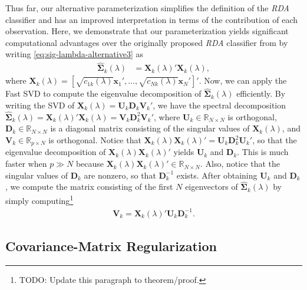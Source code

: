\documentclass[11pt]{article}
\begin{document}
Thus far, our alternative parameterization simplifies the definition of the \emph{RDA} classifier and has an improved interpretation in terms of the contribution of each observation. Here, we demonstrate that our parameterization yields significant computational advantages over the originally proposed \emph{RDA} classifier from \cite{Friedman:1989tm} by writing \eqref{eq:sig-lambda-alternative3} as
\begin{align*}
	\widehat{\bm\Sigma}_k(\lambda) &= \bm X_k(\lambda)' \bm X_k(\lambda),
\end{align*}
where $\bm X_k(\lambda) = [\sqrt{c_{1k}(\lambda)} \bm x_1', \ldots,  \sqrt{c_{Nk}(\lambda)} \bm x_N']'$. Now, we can apply the Fast SVD to compute the eigenvalue decomposition of $\widehat{\bm\Sigma}_k(\lambda)$ efficiently. By writing the SVD of $\bm X_k(\lambda) = \bm U_k \bm D_k \bm V_k'$, we have the spectral decomposition $\widehat{\bm\Sigma}_k(\lambda) = \bm X_k(\lambda)' \bm X_k(\lambda) = \bm V_k \bm D_k^2 \bm V_k'$, where $\bm U_k \in \mathbb{R}_{N \times N}$ is orthogonal, $\bm D_k \in \mathbb{R}_{N \times N}$ is a diagonal matrix consisting of the singular values of $\bm X_k(\lambda)$, and $\bm V_k \in \mathbb{R}_{p \times N}$ is orthogonal. Notice that $\bm X_k(\lambda)\bm X_k(\lambda)' = \bm U_k \bm D_k^2 \bm U_k'$, so that the eigenvalue decomposition of $\bm X_k(\lambda)\bm X_k(\lambda)'$ yields $\bm U_k$ and $\bm D_k$. This is much faster when $p \gg N$ because $\bm X_k(\lambda)\bm X_k(\lambda)' \in \mathbb{R}_{N \times N}$. Also, notice that the singular values of $\bm D_k$ are nonzero, so that $\bm D_k^{-1}$ exists. After obtaining $\bm U_k$ and $\bm D_k$, we compute the matrix consisting of the first $N$ eigenvectors of $\widehat{\bm\Sigma}_k(\lambda)$ by simply computing\footnote{TODO: Update this paragraph to theorem/proof.}
\begin{align*}
	\bm V_k = \bm X_k(\lambda)' \bm U_k \bm D_k^{-1}.
\end{align*}

\subsection{Covariance-Matrix Regularization}
\end{document}
